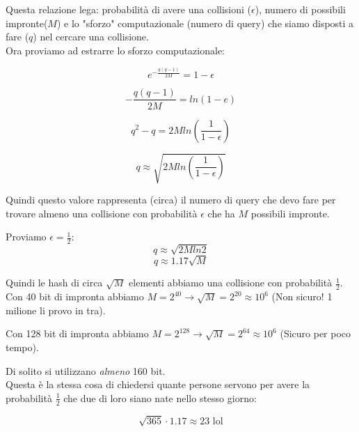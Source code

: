 Questa relazione lega: probabilità di avere una collisioni ($\epsilon$), numero di possibili impronte($M$) e lo "sforzo" computazionale (numero di query) che siamo disposti a fare ($q$) nel cercare una collisione.\\

Ora proviamo ad estrarre lo sforzo computazionale:

\begin{equation*}
	e^{-\frac{q(q-1)}{2M}} = 1 - \epsilon
\end{equation*}

\begin{equation*}
	-\frac{q(q-1)}{2M} = ln(1-e)
\end{equation*}

\begin{equation*}
	q^2 - q = 2M ln(\frac{1}{1-\epsilon})
\end{equation*}

\begin{equation*}
	q \approx \sqrt{2Mln(\frac{1}{1-\epsilon})}
\end{equation*}

Quindi questo valore rappresenta (circa) il numero di query che devo fare per trovare almeno una collisione con probabilità $\epsilon$ che ha $M$ possibili impronte.

Proviamo $\epsilon= \frac12$:
\begin{equation*}
	q \approx \sqrt{2Mln2}
\end{equation*}
\begin{equation*}
	q \approx 1.17\sqrt{M}
\end{equation*}

Quindi le hash di circa $\sqrt{M}$ elementi abbiamo una collisione con probabilità $\frac12$.\\


Con 40 bit di impronta abbiamo $M=2^{40} \rightarrow \sqrt{M} = 2^{20} \approx 10^6$ (Non sicuro! 1 milione li provo in tra).


Con 128 bit di impronta abbiamo $M=2^{128} \rightarrow \sqrt{M} = 2^{64} \approx 10^6$ (Sicuro per poco tempo).

Di solito si utilizzano \textit{almeno} 160 bit.\\

Questa è la stessa cosa di chiedersi quante persone servono per avere la probabilità $\frac12$ che due di loro siano nate nello stesso giorno:

\begin{equation*}
\sqrt{365} \cdot 1.17 \approx 23 \text{ lol}
\end{equation*}

